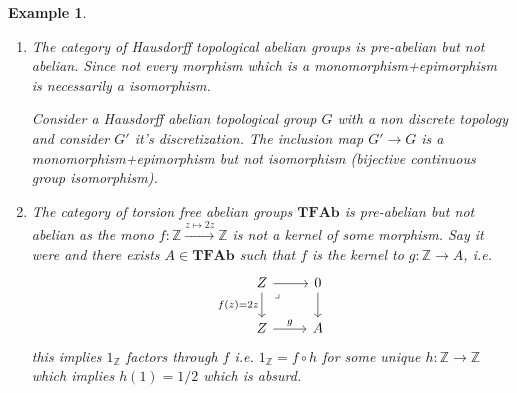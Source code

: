 \documentclass[12pt]{report}
\numberwithin{equation}{section}
\newcommand{\Z}{\mathbb{Z}}
\newtheorem{example}[dummy]{Example}
\begin{document}
	
	\begin{example}\label{expreabnotab}
		
		\begin{enumerate}Some non examples are:
			\item The category of Hausdorff topological abelian groups is pre-abelian but not abelian. Since not every morphism which is a monomorphism+epimorphism is necessarily a isomorphism. 
			
			Consider a Hausdorff abelian topological group $G$ with a non discrete topology and consider $G'$ it's discretization. The inclusion map $G' \to G$ is a monomorphism+epimorphism but not isomorphism (bijective continuous group isomorphism). 
			\item The category of torsion free abelian groups $\mathbf{TFAb}$ is pre-abelian but not abelian as the mono $f: \Z \xrightarrow{z\mapsto 2z} \Z $ is not a kernel of some morphism. Say it were and there exists $ A \in \mathbf{TFAb}$ such that $f$ is the kernel to $ g: \Z \to A$, i.e.
			\[\begin{tikzcd}
				Z & 0 \\
				Z & A
				\arrow[from=1-1, to=1-2]
				\arrow["{f(z)=2z}"', from=1-1, to=2-1]
				\arrow["\lrcorner"{anchor=center, pos=0.125}, draw=none, from=1-1, to=2-2]
				\arrow[from=1-2, to=2-2]
				\arrow["g", from=2-1, to=2-2]
			\end{tikzcd}\]
			this implies $1_\Z$ factors through $f$ i.e. $1_\Z =f\circ h$ for some unique $h:\Z \to \Z $ which implies $h(1)=1/2$ which is absurd.
		\end{enumerate}
		
	\end{example}
\end{document}
